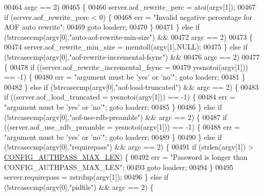 \begin{DoxyCode}
{{00464                    argc == 2)
00465         \{
00466             server.aof\_rewrite\_perc = atoi(argv[1]);
00467             \textcolor{keywordflow}{if} (server.aof\_rewrite\_perc < 0) \{
00468                 err = \textcolor{stringliteral}{"Invalid negative percentage for AOF auto rewrite"};
00469                 \textcolor{keywordflow}{goto} loaderr;
00470             \}
00471         \} \textcolor{keywordflow}{else} \textcolor{keywordflow}{if} (!strcasecmp(argv[0],\textcolor{stringliteral}{"auto-aof-rewrite-min-size"}) &&
00472                    argc == 2)
00473         \{
00474             server.aof\_rewrite\_min\_size = memtoll(argv[1],NULL);
00475         \} \textcolor{keywordflow}{else} \textcolor{keywordflow}{if} (!strcasecmp(argv[0],\textcolor{stringliteral}{"aof-rewrite-incremental-fsync"}) &&
00476                    argc == 2)
00477         \{
00478             \textcolor{keywordflow}{if} ((server.aof\_rewrite\_incremental\_fsync =
00479                  yesnotoi(argv[1])) == -1) \{
00480                 err = \textcolor{stringliteral}{"argument must be 'yes' or 'no'"}; \textcolor{keywordflow}{goto} loaderr;
00481             \}
00482         \} \textcolor{keywordflow}{else} \textcolor{keywordflow}{if} (!strcasecmp(argv[0],\textcolor{stringliteral}{"aof-load-truncated"}) && argc == 2) \{
00483             \textcolor{keywordflow}{if} ((server.aof\_load\_truncated = yesnotoi(argv[1])) == -1) \{
00484                 err = \textcolor{stringliteral}{"argument must be 'yes' or 'no'"}; \textcolor{keywordflow}{goto} loaderr;
00485             \}
00486         \} \textcolor{keywordflow}{else} \textcolor{keywordflow}{if} (!strcasecmp(argv[0],\textcolor{stringliteral}{"aof-use-rdb-preamble"}) && argc == 2) \{
00487             \textcolor{keywordflow}{if} ((server.aof\_use\_rdb\_preamble = yesnotoi(argv[1])) == -1) \{
00488                 err = \textcolor{stringliteral}{"argument must be 'yes' or 'no'"}; \textcolor{keywordflow}{goto} loaderr;
00489             \}
00490         \} \textcolor{keywordflow}{else} \textcolor{keywordflow}{if} (!strcasecmp(argv[0],\textcolor{stringliteral}{"requirepass"}) && argc == 2) \{
00491             \textcolor{keywordflow}{if} (strlen(argv[1]) > \hyperlink{server_8h_a8e9d7cd814b95c2cbd17701efe1374f2}{CONFIG\_AUTHPASS\_MAX\_LEN}) \{
00492                 err = \textcolor{stringliteral}{"Password is longer than CONFIG\_AUTHPASS\_MAX\_LEN"};
00493                 \textcolor{keywordflow}{goto} loaderr;
00494             \}
00495             server.requirepass = zstrdup(argv[1]);
00496         \} \textcolor{keywordflow}{else} \textcolor{keywordflow}{if} (!strcasecmp(argv[0],\textcolor{stringliteral}{"pidfile"}) && argc == 2) \{
}}
\end{DoxyCode}
